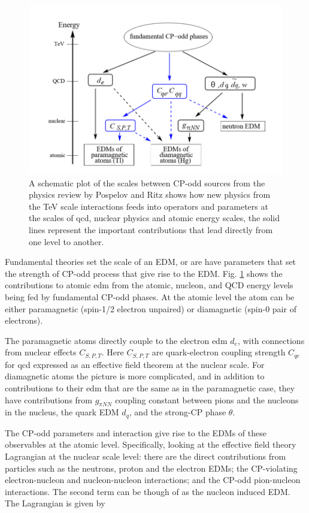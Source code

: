\begin{figure} [htbp]
	\center
	\includegraphics[width=0.8
	\textwidth]{OverviewPicture.png}
	\caption { A schematic plot of the scales between CP-odd sources from the physics review by Pospelov and Ritz \cite{Pospelov2005} shows how new physics from the TeV scale interactions feeds into operators and parameters at the scales of \gls{qcd}, nuclear physics and atomic energy scales, the solid lines represent the important contributions that lead directly from one level to another.}
		\label{fig:EDMsource}
\end{figure}

Fundamental theories set the scale of an EDM, or are have parameters that set the strength of CP-odd process that give rise to the EDM. Fig. \ref{fig:EDMsource} shows the contributions to atomic \gls{edm} from the atomic, nucleon, and QCD energy levels being fed by fundamental CP-odd phases. At the atomic level the atom can be either paramagnetic (spin-1/2 electron unpaired) or diamagnetic (spin-0 pair of electrons). 

The paramagnetic atoms directly couple to the electron  \gls{edm} $d_e$, with connections from nuclear effects $C_{S,P,T}$. Here $C_{S,P,T}$ are quark-electron coupling strength $C_{qe}$ for \gls{qcd} expressed as an effective field theorem at the nuclear scale. For diamagnetic atoms the picture is more complicated, and in addition to contributions to their \gls{edm} that are the same as in the paramagnetic case, they have contributions from $g_{\pi NN}$ coupling constant between pions and the nucleons in the nucleus, the quark EDM $d_q$, and the strong-CP phase $\theta$. 

The CP-odd parameters and interaction give rise to the EDMs of these observables at the atomic level. Specifically, looking at the effective field theory Lagrangian at the nuclear scale level: there are the direct contributions from particles such as the neutrons, proton and the electron EDMs; the CP-violating electron-nucleon and nucleon-nucleon interactions; and the CP-odd pion-nucleon interactions. The second term can be though of as the nucleon induced EDM. The Lagrangian is given by

